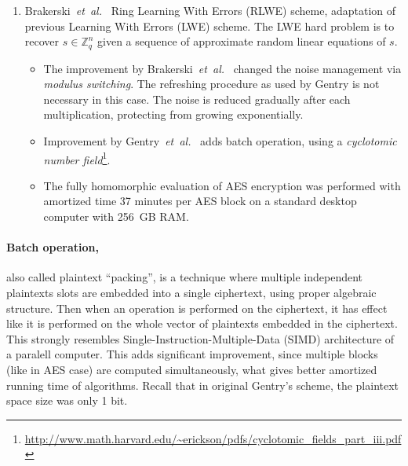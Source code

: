 \documentclass[11pt,oneside,final]{fithesis2}
\newcommand{\eal}{\emph{et~al.}}
\begin{document}
\begin{enumerate}
    \item Brakerski~\eal\ \citep{Brakerski:2011:FHE:2033036.2033075} Ring Learning With Errors (RLWE) scheme, adaptation of previous Learning With Errors (LWE) scheme.
	The LWE hard problem is to recover $s \in \mathbb{Z}^n_q$ given a sequence of approximate random linear equations of $s$.
	\begin{itemize}
	 \item The improvement by Brakerski~\eal\ \citep{Brakerski:2012:FHE:2090236.2090262} changed the noise 
	management via \emph{modulus switching}. The refreshing procedure as used by Gentry is not necessary in this case. The noise is reduced
	gradually after each multiplication, protecting from growing exponentially.
	 \item Improvement by Gentry~\eal\ \citep{Gentry:2012:RSB:2414993.2414996} adds batch operation, using a \emph{cyclotomic number field}\footnote{\url{http://www.math.harvard.edu/~erickson/pdfs/cyclotomic_fields_part_iii.pdf}}.
	 \item The fully homomorphic evaluation of AES encryption was performed \citep{journals/iacr/GentryHS12} with amortized time 37 minutes per 
	AES block on a standard desktop computer with 256~GB RAM.
	\end{itemize}

    \end{enumerate}

    \paragraph*{Batch operation,} also called plaintext ``packing'', is a technique where multiple independent plaintexts slots are embedded into a single ciphertext,
    using proper algebraic structure. Then when an operation is performed on the ciphertext, it has effect 
    like it is performed on the whole vector of plaintexts embedded in the ciphertext. 
    This strongly resembles Single-Instruction-Multiple-Data (SIMD) architecture of a paralell computer. 
    This adds significant improvement, since multiple blocks (like in AES case) are computed simultaneously, what gives better amortized running time
    of algorithms. Recall that in original Gentry's scheme,
    the plaintext space size was only 1 bit. 
\end{document}
